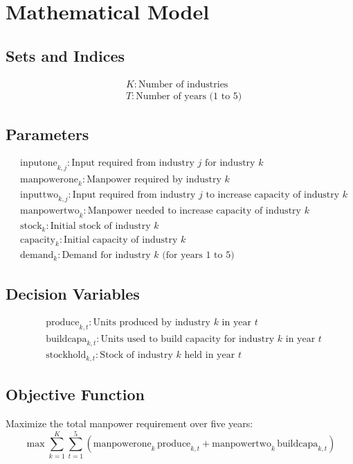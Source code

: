 \documentclass{article}
\begin{document}
\section*{Mathematical Model}

\subsection*{Sets and Indices}
\begin{align*}
& K: \text{Number of industries} \\
& T: \text{Number of years (1 to 5)}
\end{align*}

\subsection*{Parameters}
\begin{align*}
& \text{inputone}_{k,j}: \text{Input required from industry } j \text{ for industry } k \\
& \text{manpowerone}_{k}: \text{Manpower required by industry } k \\
& \text{inputtwo}_{k,j}: \text{Input required from industry } j \text{ to increase capacity of industry } k \\
& \text{manpowertwo}_{k}: \text{Manpower needed to increase capacity of industry } k \\
& \text{stock}_{k}: \text{Initial stock of industry } k \\
& \text{capacity}_{k}: \text{Initial capacity of industry } k \\
& \text{demand}_{k}: \text{Demand for industry } k \text{ (for years 1 to 5)}
\end{align*}

\subsection*{Decision Variables}
\begin{align*}
& \text{produce}_{k,t}: \text{Units produced by industry } k \text{ in year } t \\
& \text{buildcapa}_{k,t}: \text{Units used to build capacity for industry } k \text{ in year } t \\
& \text{stockhold}_{k,t}: \text{Stock of industry } k \text{ held in year } t
\end{align*}

\subsection*{Objective Function}
Maximize the total manpower requirement over five years:
\[
\max \sum_{k=1}^{K} \sum_{t=1}^{5} \left( \text{manpowerone}_k \, \text{produce}_{k,t} + \text{manpowertwo}_k \, \text{buildcapa}_{k,t} \right)
\]
\end{document}
